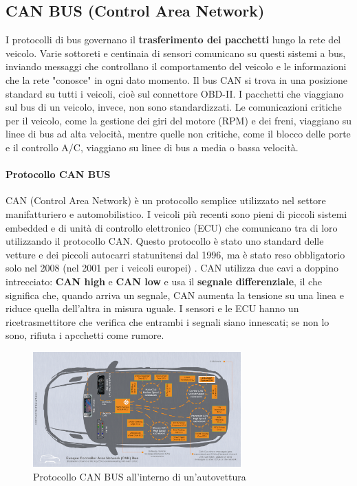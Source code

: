 \documentclass[12pt, a4paper, italian]{report}
\numberwithin{figure}{chapter}
\numberwithin{table}{chapter}
\begin{document}
\subsection{CAN BUS (Control Area Network)}
I protocolli di bus governano il \textbf{trasferimento dei pacchetti} lungo la rete del veicolo. Varie sottoreti e centinaia di sensori comunicano su questi sistemi a bus, inviando messaggi che controllano il comportamento del veicolo e le informazioni che la rete "conosce" in ogni dato momento.
Il bus CAN si trova in una posizione standard su tutti i veicoli, cioè sul connettore OBD-II. I pacchetti che viaggiano sul bus di un veicolo, invece, non sono standardizzati. Le comunicazioni critiche per il veicolo, come la gestione dei giri del motore (RPM) e dei freni, viaggiano su linee di bus ad alta velocità, mentre quelle non critiche, come il blocco delle porte e il controllo A/C, viaggiano su linee di bus a media o bassa velocità.
\paragraph{Protocollo CAN BUS} CAN (Control Area Network) è un protocollo semplice utilizzato nel settore manifatturiero e automobilistico. I veicoli più recenti sono pieni di piccoli sistemi embedded e di unità di controllo elettronico (ECU) che comunicano tra di loro utilizzando il protocollo CAN. Questo protocollo è stato uno standard delle vetture e dei piccoli autocarri statunitensi dal 1996, ma è stato reso obbligatorio solo nel 2008 (nel 2001 per i veicoli europei) \cite{manualeHacker}. CAN utilizza due cavi a doppino intrecciato: \textbf{CAN high} e \textbf{CAN low} e usa il \textbf{segnale differenziale}, il che significa che, quando arriva un segnale, CAN aumenta la tensione su una linea e riduce quella dell'altra in misura uguale. I sensori e le ECU hanno un ricetrasmettitore che verifica che entrambi i segnali siano innescati; se non lo sono, rifiuta i apcchetti come rumore. 

\begin{figure}[h]
  \centering
  \includegraphics[width=8cm]{CAN_auto.png}
  \caption{Protocollo CAN BUS all'interno di un'autovettura}
  \label{fig:Protocallo CAN-BUS}
\end{figure}
\end{document}
